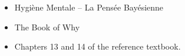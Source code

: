 \documentclass[11pt, a4paper]{article}
\begin{document}
\begin{itemize}
    \item Hygiène Mentale -- La Pensée Bayésienne
    
    
    \item The Book of Why
    
    
    \item Chapters 13 and 14 of the reference textbook.
\end{itemize}
    
\end{document}
